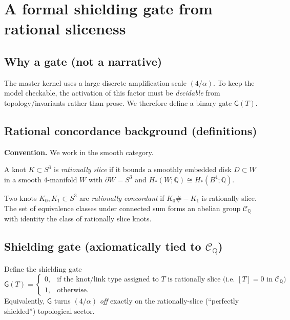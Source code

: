 \documentclass[11pt, a4paper]{article}
\begin{document}
\section{A formal shielding gate from rational sliceness}\label{sec:gate}
\subsection{Why a gate (not a narrative)}
The master kernel uses a large discrete amplification scale \((4/\alpha)\).  To keep the model checkable, the activation of this factor must be
\emph{decidable} from topology/invariants rather than prose.  We therefore define a binary gate \(\mathsf{G}(T)\).

\subsection{Rational concordance background (definitions)}
\textbf{Convention.} We work in the smooth category.

\begin{definition}\label{def:rationalslice}
A knot \(K\subset S^3\) is \emph{rationally slice} if it bounds a smoothly embedded disk \(D\subset W\) in a smooth \(4\)-manifold \(W\) with
\(\partial W=S^3\) and \(H_*(W;\mathbb{Q})\cong H_*(B^4;\mathbb{Q})\).
\end{definition}

\begin{definition}
Two knots \(K_0,K_1\subset S^3\) are \emph{rationally concordant} if \(K_0\#-K_1\) is rationally slice.
The set of equivalence classes under connected sum forms an abelian group \(\mathcal{C}_{\mathbb{Q}}\) with identity the class of rationally slice knots.
\end{definition}

\subsection{Shielding gate (axiomatically tied to \(\mathcal{C}_{\mathbb{Q}}\))}
\begin{definition}\label{def:gate}
Define the shielding gate
\[
\mathsf{G}(T)=
\begin{cases}
0,& \text{if the knot/link type assigned to }T\text{ is rationally slice (i.e. }[T]=0\text{ in }\mathcal{C}_{\mathbb{Q}}\text{)}\\
1,& \text{otherwise.}
\end{cases}
\]
Equivalently, \(\mathsf{G}\) turns \((4/\alpha)\) \emph{off} exactly on the rationally-slice (``perfectly shielded'') topological sector.
\end{definition}
\end{document}
